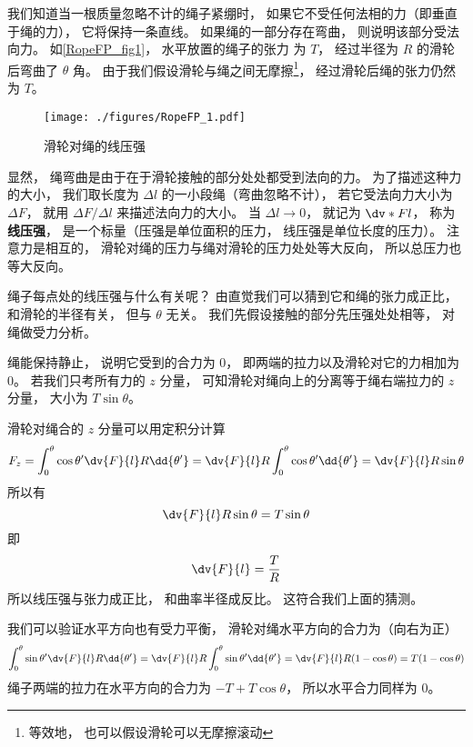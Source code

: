 

我们知道当一根质量忽略不计的绳子紧绷时， 如果它不受任何法相的力（即垂直于绳的力）， 它将保持一条直线。 如果绳的一部分存在弯曲， 则说明该部分受法向力。 如\autoref{RopeFP_fig1}， 水平放置的绳子的张力%
为 $T$， 经过半径为 $R$ 的滑轮后弯曲了 $\theta$ 角。 由于我们假设滑轮与绳之间无摩擦\footnote{等效地， 也可以假设滑轮可以无摩擦滚动}， 经过滑轮后绳的张力仍然为 $T$。
\begin{figure}[ht]
\centering
\texttt{[image: ./figures/RopeFP\_1.pdf]}
\caption{滑轮对绳的线压强} \label{RopeFP_fig1}
\end{figure}

显然， 绳弯曲是由于在于滑轮接触的部分处处都受到法向的力。 为了描述这种力的大小， 我们取长度为 $\Delta l$ 的一小段绳（弯曲忽略不计）， 若它受法向力大小为 $\Delta F$， 就用 $\Delta F/\Delta l$ 来描述法向力的大小。 当 $\Delta l \to 0$， 就记为 $\dv*{F}{l}$， 称为\textbf{线压强}， 是一个标量（压强是单位面积的压力， 线压强是单位长度的压力）。 注意力是相互的， 滑轮对绳的压力与绳对滑轮的压力处处等大反向， 所以总压力也等大反向。

绳子每点处的线压强与什么有关呢？ 由直觉我们可以猜到它和绳的张力成正比， 和滑轮的半径有关， 但与 $\theta$ 无关。 我们先假设接触的部分先压强处处相等， 对绳做受力分析。

绳能保持静止， 说明它受到的合力为 0， 即两端的拉力以及滑轮对它的力相加为 0。 若我们只考所有力的 $z$ 分量， 可知滑轮对绳向上的分离等于绳右端拉力的 $z$ 分量， 大小为 $T \sin\theta$。

滑轮对绳合的 $z$ 分量可以用定积分计算
\begin{equation}
F_z = \int_0^\theta \cos\theta' \dv{F}{l} R\dd{\theta'}
= \dv{F}{l} R \int_0^\theta \cos\theta' \dd{\theta'}
= \dv{F}{l} R \sin\theta
\end{equation}
所以有
\begin{equation}
\dv{F}{l} R \sin\theta = T \sin\theta
\end{equation}
即
\begin{equation}\label{RopeFP_eq1}
\dv{F}{l} = \frac{T}{R}
\end{equation}
所以线压强与张力成正比， 和曲率半径成反比。 这符合我们上面的猜测。

我们可以验证水平方向也有受力平衡， 滑轮对绳水平方向的合力为（向右为正）
\begin{equation}
\int_0^\theta \sin\theta' \dv{F}{l} R\dd{\theta'}
= \dv{F}{l} R \int_0^\theta \sin\theta' \dd{\theta'}
= \dv{F}{l} R (1 - \cos\theta)
= T(1 - \cos\theta)
\end{equation}
绳子两端的拉力在水平方向的合力为 $-T + T\cos\theta$， 所以水平合力同样为 0。

